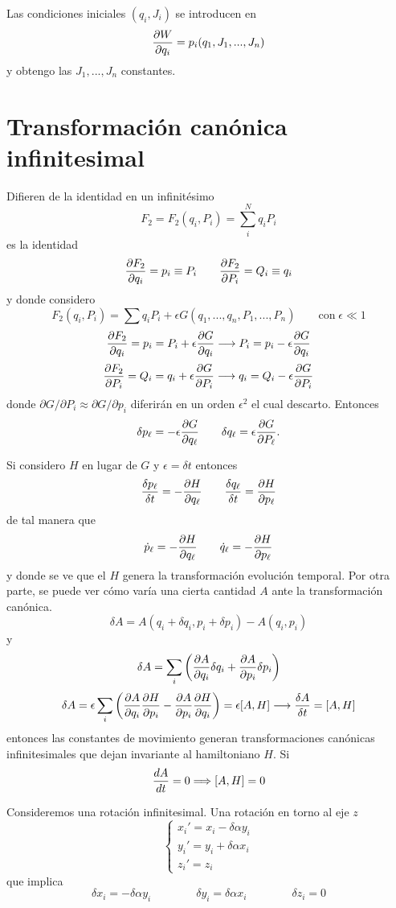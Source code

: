 \documentclass[10pt,oneside]{CBFT_book}
\begin{document}
Las condiciones iniciales $(q_i, J_i)$ se introducen en
\[
	\dpar{W}{q_i} = p_i(q_1,J_1,...,J_n)
\]
y obtengo las $J_1, ..., J_n$ constantes.

\section{Transformación canónica infinitesimal}

Difieren de la identidad en un infinitésimo
\[
	F_2 = 	F_2(q_i,P_i) = \sum_i^N q_iP_i
\]
es la identidad
\[
	\dpar{F_2}{q_i} =  p_i \equiv P_i \qquad \dpar{F_2}{P_i} =  Q_i \equiv q_i
\]
y donde considero
\[
	F_2(q_i,P_i) = \sum q_i P_i + \epsilon G(q_1,...,q_n,P_1,...,P_n) \qquad \textrm{con} \; \epsilon \ll 1
\]
\[
	\dpar{F_2}{q_i} = p_i = P_i + \epsilon\dpar{G}{q_i} \longrightarrow P_i = p_i - \epsilon\dpar{G}{q_i} 
\]
\[
	\dpar{F_2}{P_i} = Q_i = q_i + \epsilon\dpar{G}{P_i} \longrightarrow q_i = Q_i - \epsilon\dpar{G}{P_i} 	
\]
donde $\partial G/\partial P_i \approx \partial G/\partial p_i$ diferirán en un orden $\epsilon^2$ el cual
descarto. Entonces
\[
	\delta p_\ell = -\epsilon \dpar{G}{q_\ell} \qquad \delta q_\ell = \epsilon \dpar{G}{P_\ell}.
\]

Si considero $H$ en lugar de $G$ y $\epsilon = \delta t$ entonces
\[
	\frac{\delta p_\ell}{\delta t} = -\dpar{H}{q_\ell} \qquad \frac{\delta q_\ell}{\delta t} = \dpar{H}{p_\ell}
\]
de tal manera que 
\[
	\dot{p}_\ell = -\dpar{H}{q_\ell} \qquad \dot{q}_\ell = -\dpar{H}{p_\ell}
\]
y donde se ve que el $H$ genera la transformación evolución temporal.
Por otra parte, se puede ver cómo varía una cierta cantidad $A$ ante la transformación canónica.
\[
	\delta A = A(q_i + \delta q_i, p_i + \delta p_i) - A(q_i,p_i)
\]
y
\[
	\delta A = \sum_i \left( \dpar{A}{q_i} \delta q_i + \dpar{A}{p_i} \delta p_i \right)
\]
\[
	\delta A = \epsilon \sum_i \left( \dpar{A}{q_i} \dpar{H}{p_i} - \dpar{A}{p_i} \dpar{H}{q_i} \right) =
	\epsilon[A,H] \longrightarrow \frac{\delta A}{\delta t} = [A,H]
\]
entonces las constantes de movimiento generan transformaciones canónicas infinitesimales que dejan invariante
al hamiltoniano $H$. Si
\[
	\dtot{A}{t} = 0 \Longrightarrow [A,H] = 0
\]

Consideremos una rotación infinitesimal. Una rotación en torno al eje $z$
\[
	\begin{cases}
		x_i' = x_i - \delta \alpha y_i \\
		y_i' = y_i + \delta \alpha x_i \\
		z_i' = z_i
	\end{cases}
\]
que implica 
\[
	\delta x_i = -  \delta \alpha y_i \qquad \qquad \delta y_i = \delta \alpha x_i \qquad \qquad 
	\delta z_i = 0
\]
\end{document}
